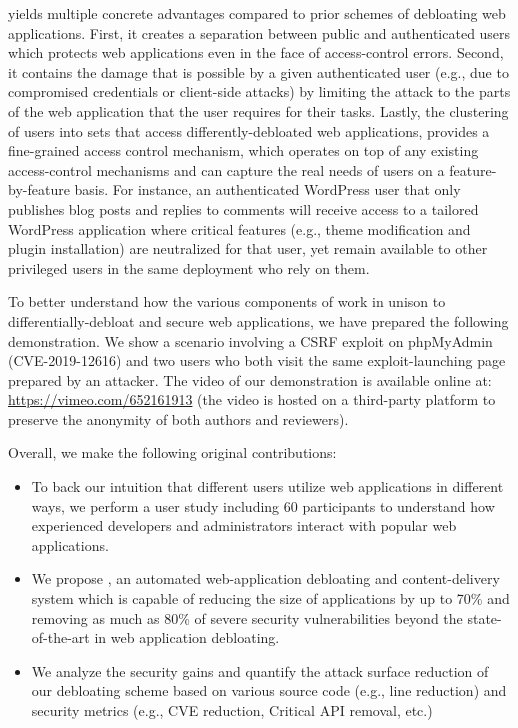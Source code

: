 
\dbltr{} yields multiple concrete advantages compared to prior schemes of debloating web applications. First, it creates a separation between public and authenticated users which protects web applications even in the face of access-control errors. 
Second, it contains the damage that is possible by a given authenticated user (e.g., due to compromised credentials or client-side attacks) by limiting the attack to the parts of the web application that the user requires for their tasks. 
Lastly, the clustering of users into sets that access differently-debloated web applications, provides a fine-grained access control mechanism, which operates on top of any existing access-control mechanisms and can capture the real needs of users on a feature-by-feature basis. 
For instance, an authenticated WordPress user that only publishes blog posts and replies to comments will receive access to a tailored WordPress application where critical features (e.g., theme modification and plugin installation) are neutralized for that user, yet remain available to other privileged users in the same deployment who rely on them. 

To better understand how the various components of \dbltr{} work in unison to differentially-debloat and secure web applications, we have prepared the following demonstration. We show a scenario involving a CSRF exploit on phpMyAdmin (CVE-2019-12616) and two users who both visit the same exploit-launching page prepared by an attacker. The video of our demonstration is available online at: \url{https://vimeo.com/652161913} (the video is hosted on a third-party platform to preserve the anonymity of both authors and reviewers).

\noindent Overall, we make the following original contributions:


\begin{itemize}
    \item To back our intuition that different users utilize web applications in different ways, we perform a user study including 60 participants to understand how experienced developers and administrators interact with popular web applications.
    \item We propose \dbltr{}, an automated web-application debloating and content-delivery system which is capable of reducing the size of applications by up to 70\% and removing as much as 80\% of severe security vulnerabilities beyond the state-of-the-art in web application debloating.
    \item We analyze the security gains and quantify the attack surface reduction of our debloating scheme based on various source code (e.g., line reduction) and security metrics (e.g., CVE reduction, Critical API removal, etc.)
\end{itemize}

